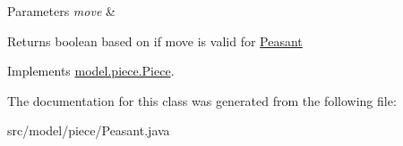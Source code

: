 \begin{DoxyParams}{Parameters}
{\em move} & \\
\hline
\end{DoxyParams}
\begin{DoxyReturn}{Returns}
boolean based on if move is valid for \hyperlink{classmodel_1_1piece_1_1_peasant}{Peasant} 
\end{DoxyReturn}


Implements \hyperlink{classmodel_1_1piece_1_1_piece_af7ce06755c9f20f3481796ca5b512849}{model.\-piece.\-Piece}.



The documentation for this class was generated from the following file\-:\begin{DoxyCompactItemize}
\item 
src/model/piece/Peasant.\-java\end{DoxyCompactItemize}
